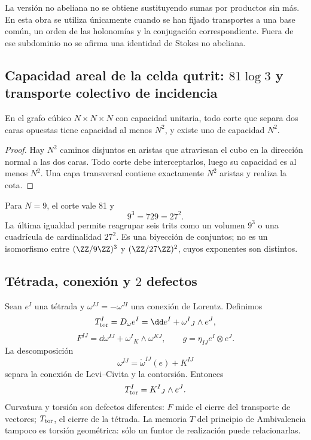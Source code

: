 La versión no abeliana no se obtiene sustituyendo sumas por productos sin más.
En esta obra se utiliza únicamente cuando se han fijado transportes a una base
común, un orden de las holonomías y la conjugación correspondiente. Fuera de
ese subdominio no se afirma una identidad de Stokes no abeliana.

\subsection{Capacidad areal de la celda qutrit: \(81\log 3\) y transporte colectivo de incidencia}

\begin{theorem}
En el grafo cúbico \(N\times N\times N\) con capacidad unitaria, todo corte
que separa dos caras opuestas tiene capacidad al menos \(N^2\), y existe uno
de capacidad \(N^2\).
\end{theorem}
\begin{proof}
Hay \(N^2\) caminos disjuntos en aristas que atraviesan el cubo en la dirección
normal a las dos caras. Todo corte debe interceptarlos, luego su capacidad es
al menos \(N^2\). Una capa transversal contiene exactamente \(N^2\) aristas y
realiza la cota.
\end{proof}

Para \(N=9\), el corte vale 81 y
\[
 9^3=729=27^2.
\]
La última igualdad permite reagrupar seis trits como un volumen \(9^3\) o una
cuadrícula de cardinalidad \(27^2\). Es una biyección de conjuntos; no es un
isomorfismo entre
\((\ZZ/9\ZZ)^3\) y \((\ZZ/27\ZZ)^2\), cuyos exponentes son distintos.

\subsection{Tétrada, conexión y \(2\) defectos}

Sean \(e^I\) una tétrada y \(\omega^{IJ}=-\omega^{JI}\) una conexión de
Lorentz. Definimos
\[
 T_{\rm tor}^I=D_\omega e^I
 =\dd e^I+\omega^I{}_J\wedge e^J,
\]
\[
 F^{IJ}=\dd\omega^{IJ}+\omega^I{}_K\wedge\omega^{KJ},
 \qquad
 g=\eta_{IJ}e^I\otimes e^J.
\]
La descomposición
\[
 \omega^{IJ}=\mathring\omega^{IJ}(e)+K^{IJ}
\]
separa la conexión de Levi--Civita y la contorsión. Entonces
\[
 T_{\rm tor}^I=K^I{}_J\wedge e^J.
\]
Curvatura y torsión son defectos diferentes: \(F\) mide el cierre del
transporte de vectores; \(T_{\rm tor}\), el cierre de la tétrada. La memoria
\(T\) del principio de Ambivalencia tampoco es torsión geométrica: sólo un
funtor de realización puede relacionarlas.

